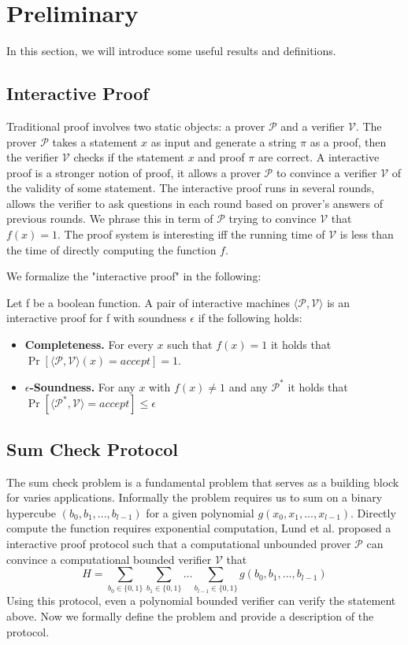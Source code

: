 \section{Preliminary}
In this section, we will introduce some useful results and definitions.
\subsection{Interactive Proof}
Traditional proof involves two static objects: a prover $\mathcal{P}$ and a verifier $\mathcal{V}$. The prover $\mathcal{P}$ takes a statement $x$ as input and generate a string $\pi$ as a proof, then the verifier $\mathcal{V}$ checks if the statement $x$ and proof $\pi$ are correct. A interactive proof is a stronger notion of proof, it allows a prover $\mathcal{P}$ to convince a verifier $\mathcal{V}$ of the validity of some statement. The interactive proof runs in several rounds, allows the verifier to ask questions in each round based on prover's answers of previous rounds. We phrase this in term of $\mathcal{P}$ trying to convince $\mathcal{V}$ that $f(x)=1$. The proof system is interesting iff the running time of $\mathcal{V}$ is less than the time of directly computing the function $f$.

We formalize the "interactive proof" in the following:

\begin{definition}
Let f be a boolean function. A pair of interactive machines $\langle\mathcal{P}, \mathcal{V}\rangle$ is an interactive proof for f with soundness $\epsilon$ if the following holds:
\begin{itemize}
	\item {\bf Completeness.} For every $x$ such that $f(x) = 1$ it holds that $\Pr[\langle\mathcal{P}, \mathcal{V}\rangle(x)=accept]=1$.
	\item {\bf $\epsilon$-Soundness.} For any $x$ with $f(x) \neq 1$ and any $\mathcal{P}^*$ it holds that $\Pr[\langle\mathcal{P^*},\mathcal{V}\rangle=accept] \le \epsilon$
\end{itemize}
\end{definition}

\subsection{Sum Check Protocol}
The sum check problem is a fundamental problem that serves as a building block for varies applications. Informally the problem requires us to sum on a binary hypercube $(b_0, b_1, ..., b_{l-1})$ for a given polynomial $g(x_0, x_1, ..., x_{l-1})$. Directly compute the function requires exponential computation, Lund et al.\cite{sumcheck} proposed a interactive proof protocol such that a computational unbounded prover $\mathcal{P}$ can convince a computational bounded verifier $\mathcal{V}$ that $$H=\sum_{b_0\in\{0,1\}}\sum_{b_1\in\{0,1\}}...\sum_{b_{l-1}\in\{0,1\}}g(b_0,b_1,...,b_{l-1})$$
Using this protocol, even a polynomial bounded verifier can verify the statement above. Now we formally define the problem and provide a description of the protocol.

